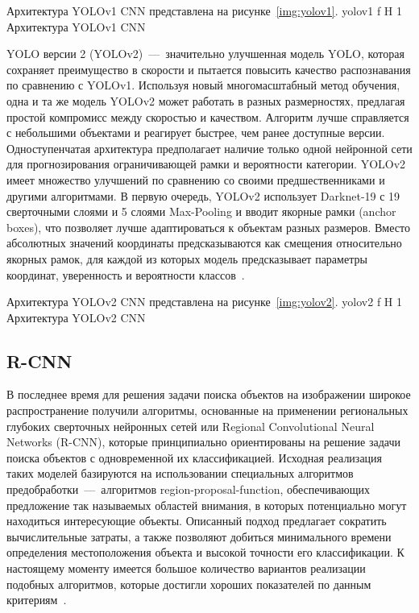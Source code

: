 Архитектура YOLOv1 CNN представлена на рисунке~\ref{img:yolov1}.
	{yolov1}
	{f}
	{H}
	{1\textwidth}
	{Архитектура YOLOv1 CNN}

YOLO версии 2 (YOLOv2)~---~значительно улучшенная модель YOLO, которая сохраняет преимущество в скорости и пытается повысить качество распознавания по сравнению с YOLOv1.
Используя новый многомасштабный метод обучения, одна и та же модель YOLOv2 может работать в разных размерностях, предлагая простой компромисс между скоростью и качеством.
Алгоритм лучше справляется с небольшими объектами и реагирует быстрее, чем ранее доступные версии.
Одноступенчатая архитектура предполагает наличие только одной нейронной сети для прогнозирования ограничивающей рамки и вероятности категории.
YOLOv2 имеет множество улучшений по сравнению со своими предшественниками и другими алгоритмами.
В первую очередь, YOLOv2 использует Darknet-19 с 19 сверточными слоями и 5 слоями Max-Pooling и вводит якорные рамки (anchor boxes), что позволяет лучше адаптироваться к объектам разных размеров.
Вместо абсолютных значений координаты предсказываются как смещения относительно якорных рамок, для каждой из которых модель предсказывает параметры координат, уверенность и вероятности классов~\cite{yolochina, yolobase}.

Архитектура YOLOv2 CNN представлена на рисунке~\ref{img:yolov2}.
	{yolov2}
	{f}
	{H}
	{1\textwidth}
	{Архитектура YOLOv2 CNN}

\subsection{R-CNN}

В последнее время для решения задачи поиска объектов на изображении широкое распространение получили алгоритмы, основанные на применении региональных глубоких сверточных нейронных сетей или Regional Convolutional Neural Networks (R-CNN), которые принципиально ориентированы на решение задачи поиска объектов с одновременной их классификацией.
Исходная реализация таких моделей базируются на использовании специальных алгоритмов предобработки~---~алгоритмов region-proposal-function, обеспечивающих предложение так называемых областей внимания, в которых потенциально могут находиться интересующие объекты.
Описанный подход предлагает сократить вычислительные затраты, а также позволяют добиться минимального времени определения местоположения объекта и высокой точности его классификации.
К настоящему моменту имеется большое количество вариантов реализации подобных алгоритмов, которые достигли хороших показателей по данным критериям~\cite{rcnn}.

